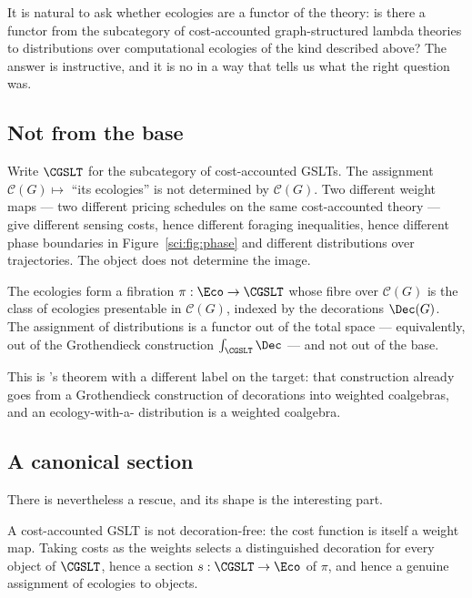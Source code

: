 It is natural to ask whether ecologies are a functor of the theory: is there a functor from the
subcategory of cost-accounted graph-structured lambda theories to distributions over computational
ecologies of the kind described above? The answer is instructive, and it is no in a way that tells us
what the right question was.

\subsection{Not from the base}\label{sci:S15.1}

Write $\CGSLT$ for the subcategory of cost-accounted GSLTs. The assignment
$\mathcal{C}(G) \mapsto$ ``its ecologies'' is not determined by $\mathcal{C}(G)$. Two different weight
maps --- two different pricing schedules on the same cost-accounted theory --- give different sensing
costs, hence different foraging inequalities, hence different phase boundaries in
Figure~\ref{sci:fig:phase} and different distributions over trajectories. The object does not determine
the image.

\begin{proposition}
\label{sci:prop:fibration}
The ecologies form a fibration $\pi : \Eco \to \CGSLT$ whose fibre over $\mathcal{C}(G)$ is the class
of ecologies presentable in $\mathcal{C}(G)$, indexed by the decorations $\Dec(G)$. The assignment of
distributions is a functor out of the total space --- equivalently, out of the Grothendieck
construction $\textstyle\int_{\CGSLT} \Dec$ --- and not out of the base.
\end{proposition}

This is \cite{StochSim}'s theorem with a different label on the target: that construction already goes
from a Grothendieck construction of decorations into weighted coalgebras, and an ecology-with-a-
distribution is a weighted coalgebra.

\subsection{A canonical section}\label{sci:S15.2}

There is nevertheless a rescue, and its shape is the interesting part.

\begin{proposition}
\label{sci:prop:section}
A cost-accounted GSLT is not decoration-free: the cost function is itself a weight map. Taking costs
as the weights selects a distinguished decoration for every object of $\CGSLT$, hence a section
$s : \CGSLT \to \Eco$ of $\pi$, and hence a genuine assignment of ecologies to objects.
\end{proposition}

